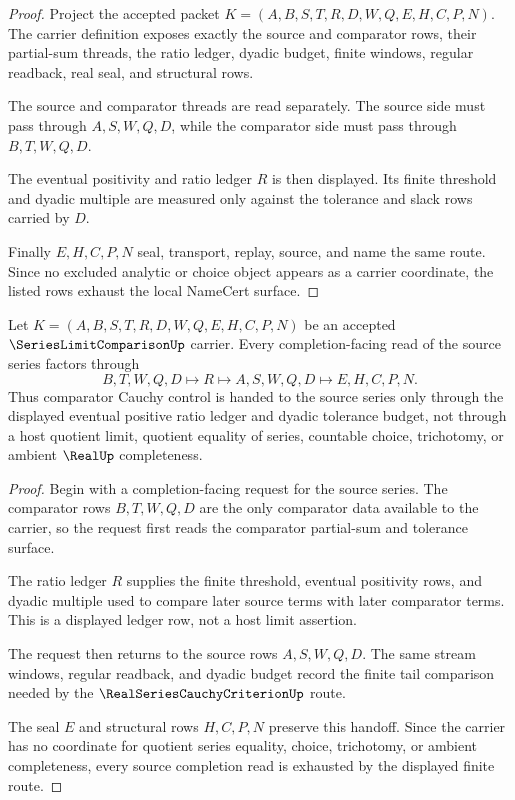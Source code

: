 \begin{proof}
Project the accepted packet $K=(A,B,S,T,R,D,W,Q,E,H,C,P,N)$. The carrier definition exposes exactly the source and comparator rows, their partial-sum threads, the ratio ledger, dyadic budget, finite windows, regular readback, real seal, and structural rows.

The source and comparator threads are read separately. The source side must pass through $A,S,W,Q,D$, while the comparator side must pass through $B,T,W,Q,D$.

The eventual positivity and ratio ledger $R$ is then displayed. Its finite threshold and dyadic multiple are measured only against the tolerance and slack rows carried by $D$.

Finally $E,H,C,P,N$ seal, transport, replay, source, and name the same route. Since no excluded analytic or choice object appears as a carrier coordinate, the listed rows exhaust the local NameCert surface.
\end{proof}

\begin{theorem}\label{thm:series-limit-comparison-cauchy-handoff}
Let $K=(A,B,S,T,R,D,W,Q,E,H,C,P,N)$ be an accepted $\SeriesLimitComparisonUp$ carrier. Every completion-facing read of the source series factors through
$$
B,T,W,Q,D \longmapsto R \longmapsto A,S,W,Q,D \longmapsto E,H,C,P,N .
$$
Thus comparator Cauchy control is handed to the source series only through the displayed eventual positive ratio ledger and dyadic tolerance budget, not through a host quotient limit, quotient equality of series, countable choice, trichotomy, or ambient $\RealUp$ completeness.
\end{theorem}
\begin{proof}
Begin with a completion-facing request for the source series. The comparator rows $B,T,W,Q,D$ are the only comparator data available to the carrier, so the request first reads the comparator partial-sum and tolerance surface.

The ratio ledger $R$ supplies the finite threshold, eventual positivity rows, and dyadic multiple used to compare later source terms with later comparator terms. This is a displayed ledger row, not a host limit assertion.

The request then returns to the source rows $A,S,W,Q,D$. The same stream windows, regular readback, and dyadic budget record the finite tail comparison needed by the $\RealSeriesCauchyCriterionUp$ route.

The seal $E$ and structural rows $H,C,P,N$ preserve this handoff. Since the carrier has no coordinate for quotient series equality, choice, trichotomy, or ambient completeness, every source completion read is exhausted by the displayed finite route.
\end{proof}


